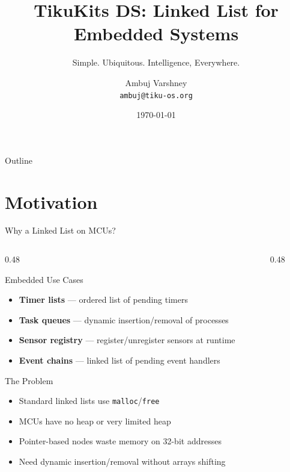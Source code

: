 \documentclass[aspectratio=169, 10pt]{beamer}
\title[TikuKits DS]{TikuKits DS: Linked List for Embedded Systems}
\subtitle{Simple. Ubiquitous. Intelligence, Everywhere.}
\author[Ambuj Varshney]{Ambuj Varshney \\ \texttt{ambuj@tiku-os.org}}
\date{\today}
\begin{document}
\begin{frame}
\titlepage
\end{frame}

\begin{frame}{Outline}
\tableofcontents
\end{frame}

\section{Motivation}

\begin{frame}{Why a Linked List on MCUs?}
\begin{columns}[T]
\begin{column}{0.48\textwidth}
\begin{block}{Embedded Use Cases}
\begin{itemize}
  \item \textbf{Timer lists} --- ordered list of pending timers
  \item \textbf{Task queues} --- dynamic insertion/removal of processes
  \item \textbf{Sensor registry} --- register/unregister sensors at runtime
  \item \textbf{Event chains} --- linked list of pending event handlers
\end{itemize}
\end{block}

\begin{block}{The Problem}
\begin{itemize}
  \item Standard linked lists use \texttt{malloc}/\texttt{free}
  \item MCUs have no heap or very limited heap
  \item Pointer-based nodes waste memory on 32-bit addresses
  \item Need dynamic insertion/removal without arrays shifting
\end{itemize}
\end{block}
\end{column}

\begin{column}{0.48\textwidth}
\begin{center}
\end{center}


\end{column}
\end{columns}
\end{frame}
\end{document}
